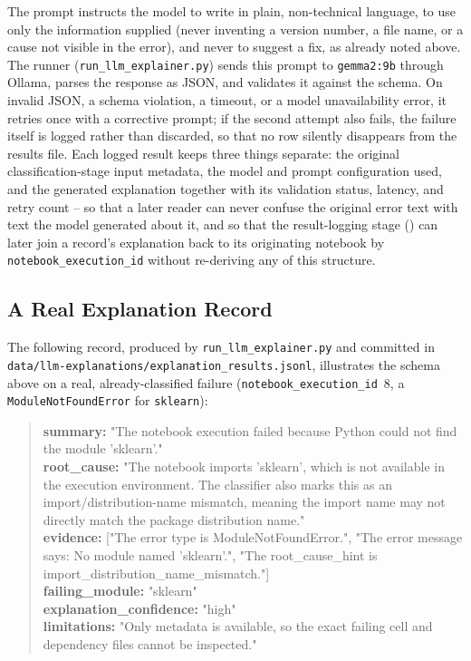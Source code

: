 The prompt instructs the model to write in plain, non-technical language,
to use only the information supplied (never inventing a version number, a
file name, or a cause not visible in the error), and never to suggest a fix,
as already noted above. The runner (\texttt{run\_llm\_explainer.py}) sends
this prompt to \texttt{gemma2:9b} through Ollama, parses the response as
JSON, and validates it against the schema. On invalid JSON, a schema
violation, a timeout, or a model unavailability error, it retries once with
a corrective prompt; if the second attempt also fails, the failure itself is
logged rather than discarded, so that no row silently disappears from the
results file. Each logged result keeps three things separate: the original
classification-stage input metadata, the model and prompt configuration
used, and the generated explanation together with its validation status,
latency, and retry count -- so that a later reader can never confuse the
original error text with text the model generated about it, and so that the
result-logging stage () can later join a record's
explanation back to its originating notebook by
\texttt{notebook\_execution\_id} without re-deriving any of this structure.

\subsection{A Real Explanation Record}
\label{sec:m-explanation-example}

The following record, produced by \texttt{run\_llm\_explainer.py} and
committed in
\texttt{data/llm-explanations/\allowbreak explanation\_results.jsonl},
illustrates the schema above on a real, already-classified failure
(\texttt{notebook\_execution\_id}~8, a \texttt{ModuleNotFoundError} for
\texttt{sklearn}):

\begin{quote}
\small
\textbf{summary:} "The notebook execution failed because Python could not
find the module 'sklearn'."\\[2pt]
\textbf{root\_cause:} "The notebook imports 'sklearn', which is not
available in the execution environment. The classifier also marks this as
an import/distribution-name mismatch, meaning the import name may not
directly match the package distribution name."\\[2pt]
\textbf{evidence:} ["The error type is ModuleNotFoundError.", "The error
message says: No module named 'sklearn'.", "The root\_cause\_hint is
import\_distribution\_name\_mismatch."]\\[2pt]
\textbf{failing\_module:} "sklearn"\\[2pt]
\textbf{explanation\_confidence:} "high"\\[2pt]
\textbf{limitations:} "Only metadata is available, so the exact failing
cell and dependency files cannot be inspected."
\end{quote}

